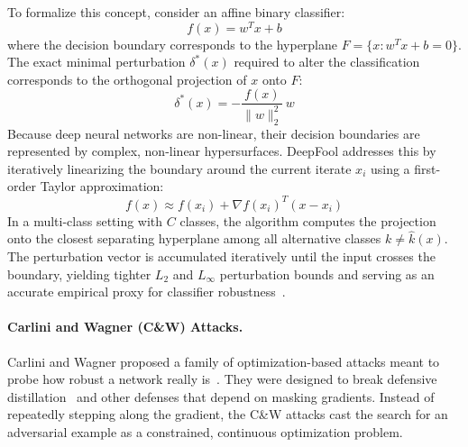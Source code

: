 \documentclass[12pt]{article}
\begin{document}
To formalize this concept, consider an affine binary classifier:
\begin{equation}
  f(x) = w^{T}x + b
\end{equation}
where the decision boundary corresponds to the hyperplane $F = \{x : w^{T}x + b = 0\}$. The exact minimal perturbation $\delta^{*}(x)$ required to alter the classification corresponds to the orthogonal projection of $x$ onto $F$:
\begin{equation}
  \delta^{*}(x) = -\frac{f(x)}{\lVert w \rVert_2^{2}}\, w
\end{equation}
Because deep neural networks are non-linear, their decision boundaries are represented by complex, non-linear hypersurfaces. DeepFool addresses this by iteratively linearizing the boundary around the current iterate $x_i$ using a first-order Taylor approximation:
\begin{equation}
  f(x) \approx f(x_i) + \nabla f(x_i)^{T}(x - x_i)
\end{equation}
In a multi-class setting with $C$ classes, the algorithm computes the projection onto the closest separating hyperplane among all alternative classes $k \neq \hat{k}(x)$.
The perturbation vector is accumulated iteratively until the input crosses the boundary, yielding tighter $L_2$ and $L_\infty$ perturbation bounds and serving as an accurate empirical proxy for classifier robustness~\cite{moosavi2016}.

\paragraph{Carlini and Wagner (C\&W) Attacks.} Carlini and Wagner proposed a family of optimization-based attacks meant to probe how robust a network really is~\cite{carlini2017}. They were designed to break defensive distillation~\cite{papernot2016distill} and other defenses that depend on masking gradients. Instead of repeatedly stepping along the gradient, the C\&W attacks cast the search for an adversarial example as a constrained, continuous optimization problem.
\end{document}
